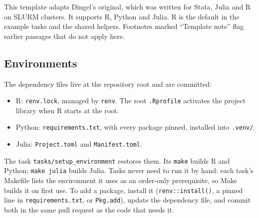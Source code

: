 \label{entry:adapting}
This template adapts Dingel's original, which was written for Stata, Julia and R on SLURM clusters.
It supports R, Python and Julia.
R is the default in the example tasks and the shared helpers.
Footnotes marked ``Template note'' flag earlier passages that do not apply here.

\subsection{Environments}
The dependency files live at the repository root and are committed:
\begin{itemize}
	\item R: \texttt{renv.lock}, managed by \texttt{renv}. The root \texttt{.Rprofile} activates the project library when R starts at the root.
	\item Python: \texttt{requirements.txt}, with every package pinned, installed into \texttt{.venv/}.
	\item Julia: \texttt{Project.toml} and \texttt{Manifest.toml}.
\end{itemize}
The task \texttt{tasks/setup\_environment} restores them.
Its \texttt{make} builds R and Python; \texttt{make julia} builds Julia.
Tasks never need to run it by hand: each task's Makefile lists the environment it uses as an order-only prerequisite, so Make builds it on first use.
To add a package, install it (\texttt{renv::install()}, a pinned line in \texttt{requirements.txt}, or \texttt{Pkg.add}), update the dependency file, and commit both in the same pull request as the code that needs it.

